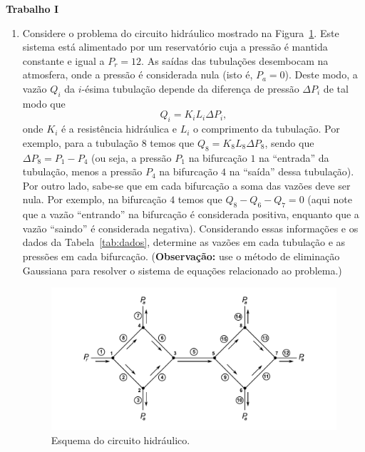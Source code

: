 \documentclass[12pt,a4paper]{article}
\begin{document}
\begin{center}
  \textbf{Trabalho I}
\end{center}

\begin{enumerate}
  
  \item Considere o problema do circuito hidráulico mostrado na Figura~\ref{fig:tub}.
  Este sistema está alimentado por um reservatório cuja a pressão é mantida constante
  e igual a $P_r = 12$. As saídas das tubulações desembocam na atmosfera, onde a
  pressão é considerada nula (isto é, $P_a = 0$). Deste modo, a vazão $Q_i$ da
  $i$-ésima tubulação depende da diferença de pressão $\Delta P_i$ de tal modo que
  $$Q_i = K_iL_i\Delta P_i,$$ onde $K_i$ é a resistência hidráulica e $L_i$ o
  comprimento da tubulação. Por exemplo, para a tubulação $8$ temos que
  $Q_8 = K_8L_8\Delta P_8$, sendo que $\Delta P_8 = P_1 - P_4$ (ou seja,
  a pressão $P_1$ na bifurcação $1$ na ``entrada'' da tubulação, menos a
  pressão $P_4$ na bifurcação $4$ na ``saída'' dessa tubulação).
  Por outro lado, sabe-se que em cada bifurcação a soma das vazões 
  deve ser nula. Por exemplo, na bifurcação $4$ temos que $Q_8 - Q_6 - Q_7 = 0$
  (aqui note que a vazão ``entrando'' na bifurcação é considerada positiva,
  enquanto que a vazão ``saindo'' é considerada negativa). Considerando essas
  informações e os dados da Tabela~\ref{tab:dados}, determine as vazões em
  cada tubulação e as pressões em cada bifurcação. (\textbf{Observação:} use
  o método de eliminação Gaussiana para resolver o sistema de equações
  relacionado ao problema.)

  \begin{figure}[H]
    \centering
    \includegraphics[scale=0.75]{imagem/tubulacao-circuito-hidraulico.pdf}
    \caption{Esquema do circuito hidráulico.}
    \label{fig:tub}
  \end{figure}


\end{enumerate}
\end{document}
